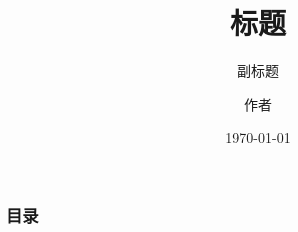 \documentclass{beamer}
\title{标题}
\subtitle{副标题}
\author{作者}
\institute[单位缩写]{单位}
\date{\today}
\begin{document}
\frame{\titlepage}
\begin{frame}\frametitle{目录}
	\tableofcontents
\end{frame}
\end{document}
